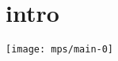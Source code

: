 \documentclass[11pt]{article}
\begin{document}
    \begin{center}
    \end{center}
    \section*{intro}
    \texttt{[image: mps/main-0]}
    

    


%    
\end{document}
